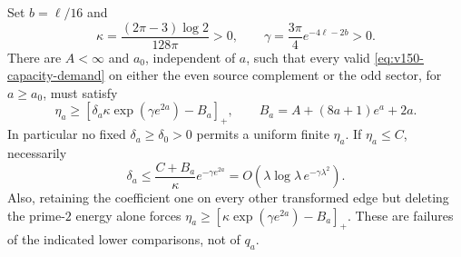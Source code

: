 \begin{proposition}
\label{prop:v150-capacity-slack}
Set $b=\ell/16$ and
\[
 \kappa=\frac{(2\pi-3)\log2}{128\pi}>0,\qquad
 \gamma=\frac{3\pi}{4}e^{-4\ell-2b}>0.
\]
There are $A<\infty$ and $a_0$, independent of $a$, such that every
valid \eqref{eq:v150-capacity-demand} on either the even source
complement or the odd sector, for $a\ge a_0$, must satisfy
\begin{equation}\label{eq:v150-slack-budget}
 \eta_a\ge\left[\delta_a\kappa\exp(\gamma e^{2a})-B_a\right]_+,
 \qquad B_a=A+(8a+1)e^a+2a.
\end{equation}
In particular no fixed $\delta_a\ge\delta_0>0$ permits a uniform
finite $\eta_a$. If $\eta_a\le C$, necessarily
\begin{equation}\label{eq:v150-slack-rate}
 \delta_a\le\frac{C+B_a}{\kappa}e^{-\gamma e^{2a}}
       =O(\lambda\log\lambda\,e^{-\gamma\lambda^2}).
\end{equation}
Also, retaining the coefficient one on every other transformed edge
but deleting the prime-$2$ energy alone forces
$\eta_a\ge[\kappa\exp(\gamma e^{2a})-B_a]_+$.
These are failures of the indicated lower comparisons, not of $q_a$.
\end{proposition}
